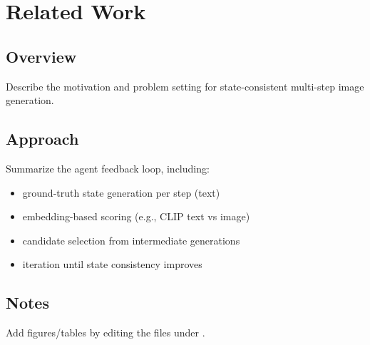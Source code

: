 \chapter{Related Work}


\section{Overview}
Describe the motivation and problem setting for state-consistent multi-step image generation.

\section{Approach}
Summarize the agent feedback loop, including:
\begin{itemize}
  \item ground-truth state generation per step (text)
  \item embedding-based scoring (e.g., CLIP text vs image)
  \item candidate selection from intermediate generations
  \item iteration until state consistency improves
\end{itemize}

\section{Notes}
Add figures/tables by editing the files under \texttt{}.
